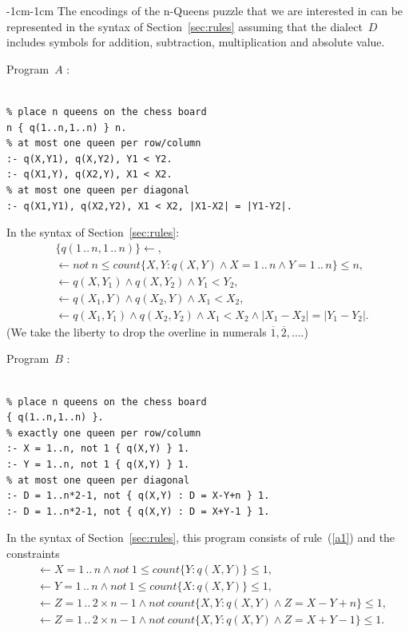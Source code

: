 \documentclass[11pt]{article}
\def\o{\overline}
\def\ar{\leftarrow}
\newcommand{\co}{\ensuremath{\mathit{count}}}
\newcommand{\no}{\ensuremath{\mathit{not}}}
\begin{document}
\begin{adjustwidth}{-1cm}{-1cm}
The encodings of the n-Queens puzzle that we are interested in can be
represented in the syntax of Section~\ref{sec:rules} assuming that the
dialect~$D$ includes symbols for addition, subtraction, multiplication and
absolute value.

Program~$A$ \cite[Table~2]{geb11b}:
\begin{verbatim}

% place n queens on the chess board
n { q(1..n,1..n) } n.
% at most one queen per row/column
:- q(X,Y1), q(X,Y2), Y1 < Y2.
:- q(X1,Y), q(X2,Y), X1 < X2.
% at most one queen per diagonal
:- q(X1,Y1), q(X2,Y2), X1 < X2, |X1-X2| = |Y1-Y2|.

\end{verbatim}

In the syntax of Section~\ref{sec:rules}:
\begin{align}
& \{q(1\,..\,n,1\,..\,n)\}\ar,\label{a1}\\
& \ar \no\ n\leq  \co\{ X,Y : q(X,Y) \land X = 1\,..\,n \land Y = 1\,..\,n \}
  \leq n,
  \label{a2}\\
& \ar q(X,Y_1) \land q(X,Y_2) \land Y_1 < Y_2,\label{a3}\\
& \ar q(X_1,Y) \land q(X_2,Y) \land X_1 < X_2,\label{a4}\\
& \ar q(X_1,Y_1) \land q(X_2,Y_2) \land X_1 < X_2 \land |X_1-X_2| = |Y_1-Y_2|.
  \label{a5}
\end{align}
(We take the liberty to drop the overline in numerals $\o 1,\o 2,\dots$.)
\medskip

Program~$B$ \cite[Table~3]{geb11b}:
\begin{verbatim}

% place n queens on the chess board
{ q(1..n,1..n) }.
% exactly one queen per row/column
:- X = 1..n, not 1 { q(X,Y) } 1.
:- Y = 1..n, not 1 { q(X,Y) } 1.
% at most one queen per diagonal
:- D = 1..n*2-1, not { q(X,Y) : D = X-Y+n } 1.
:- D = 1..n*2-1, not { q(X,Y) : D = X+Y-1 } 1.

\end{verbatim}

In the syntax of Section~\ref{sec:rules}, this program
consists of rule~(\ref{a1}) and the constraints
\begin{align}
&\ar X = 1\,..\,n \land \no\ 1\leq \co\{ Y : q(X,Y) \} \leq 1,\label{b2}\\
& \ar Y = 1\,..\,n \land \no\ 1\leq \co\{ X : q(X,Y) \} \leq 1,\label{b3}\\
& \ar Z = 1\,..\,2\times n-1
  \land \no\   \co\{ X,Y : q(X,Y) \land Z = X-Y+n \} \leq  1,
  \label{b4}\\
& \ar Z = 1\,..\,2\times n-1
  \land \no\   \co\{ X,Y : q(X,Y) \land Z = X+Y-1 \} \leq  1.
  \label{b5}
\end{align}


\end{adjustwidth}
\end{document}
